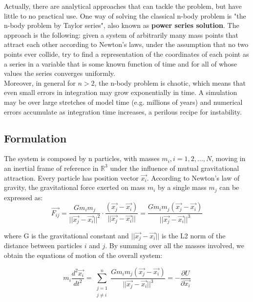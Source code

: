 \documentclass{article}
\begin{document}
Actually, there are analytical approaches that can tackle the problem, but have little to no practical use. One way of solving the classical n-body problem is "the n-body problem by Taylor series", also known as \textbf{power series solution}. The approach is the following: given a system of arbitrarily many mass points that attract each other according to Newton's laws, under the assumption that no two points ever collide, try to find a representation of the coordinates of each point as a series in a variable that is some known function of time and for all of whose values the series converges uniformly. \cite{wang2001power} \\

Moreover, in general for $n > 2$, the n-body problem is chaotic, which means that even small errors in integration may grow exponentially in time. A simulation may be over large stretches of model time (e.g. millions of years) and numerical errors accumulate as integration time increases, a perilous recipe for instability.

\subsection{Formulation}
The system is composed by n particles, with masses $m_i, i = 1,2, ... ,N$, moving in an inertial frame of reference in $\mathbb{R}^3$ under the influence of mutual gravitational attraction. Every particle has position vector $\vec{x_i}$. According to Newton's law of gravity, the gravitational force exerted on mass $m_i$ by a single mass $m_j$ can be expressed as: \cite{meyer1999periodic} \\
\begin{equation}
\label{gravitational_force}
\vec{F_{ij}} = \frac{Gm_im_j}{||\vec{x_j} - \vec{x_i}||^2} \cdot \frac{(\vec{x_j} - \vec{x_i})}{||\vec{x_j} - \vec{x_i}||} = \frac{Gm_im_j (\vec{x_j} - \vec{x_i})}{||\vec{x_j} - \vec{x_i}||^3}
\end{equation}

\noindent where G is the gravitational constant and $||\vec{x_j} - \vec{x_i}||$ is the L2 norm of the distance between particles $i$ and $j$.
By summing over all the masses involved, we obtain the equations of motion of the overall system:

$$m_i \frac{\textit{d}^2 \vec{x_i}}{\textit{dt}^2} = \sum_{\substack{j=1 \\ 
j \neq i}}^{n} \frac{Gm_im_j (\vec{x_j} - \vec{x_i})}{||\vec{x_j} - \vec{x_i}||^3} = -\frac{\partial \textit{U}}{\partial \vec{x_i}}$$
\end{document}
